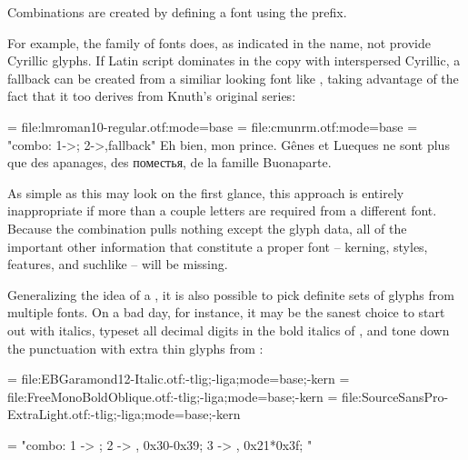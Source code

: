Combinations are created by defining a font using the  prefix.


For example, the  family of fonts does, as indicated
in the name, not provide Cyrillic glyphs. If Latin script dominates in the copy
with interspersed Cyrillic, a fallback can be created from a similiar looking
font like , taking advantage of the fact
that it too derives from Knuth’s original  series:

\beginlisting
  
  \font \lm  = file:lmroman10-regular.otf:mode=base
  \font \cmu = file:cmunrm.otf:mode=base
  \font \lmu = "combo: 1->\fontid\lm; 2->\fontid\cmu,fallback"
  \lmu Eh bien, mon prince. Gênes et Lueques ne sont plus que des
       apanages, des поместья, de la famille Buonaparte.
  \bye
\endlisting

As simple as this may look on the first glance, this approach is entirely
inappropriate if more than a couple letters are required from a different font.
Because the combination pulls nothing except the glyph data, all of the
important other information that constitute a proper font -- kerning, styles,
features, and suchlike -- will be missing.

\endsubsection %


Generalizing the idea of a , it is also possible to
pick definite sets of glyphs from multiple fonts. On a bad day, for instance,
it may be the sanest choice to start out with  italics,
typeset all decimal digits in the bold italics of ,
and tone down the punctuation with extra thin glyphs from :

\beginlisting
  \def \feats     {-tlig;-liga;mode=base;-kern}
  \def \fileone   {EBGaramond12-Italic.otf}
  \def \filetwo   {FreeMonoBoldOblique.otf}
  \def \filethree {SourceSansPro-ExtraLight.otf}

  

  \font \one   = file:\fileone  :\feats
  \font \two   = file:\filetwo  :\feats
  \font \three = file:\filethree:\feats

  \font \onetwothree = "combo:  1 -> \fontid\one;
                                2 -> \fontid\two,   0x30-0x39;
                                3 -> \fontid\three, 0x21*0x3f; "

